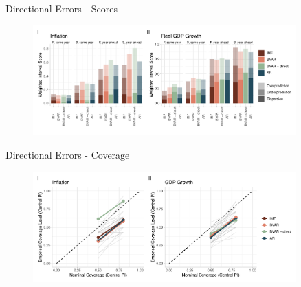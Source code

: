 \documentclass[en]{sdqbeamer}
\begin{document}

\appendix
\beginbackup
\begin{frame}{Directional Errors - Scores}
\label{errorextraction}
\begin{figure}
        \centering
        \includegraphics[width=0.9\textwidth]{figures/wis_cpigdp_new_directional.pdf}
    \end{figure}
\end{frame}
\begin{frame}{Directional Errors - Coverage}
\begin{figure}
        \centering
        \includegraphics[width=0.9\textwidth]{figures/coverage_directional.pdf}
    \end{figure}
\end{frame}
\end{document}
